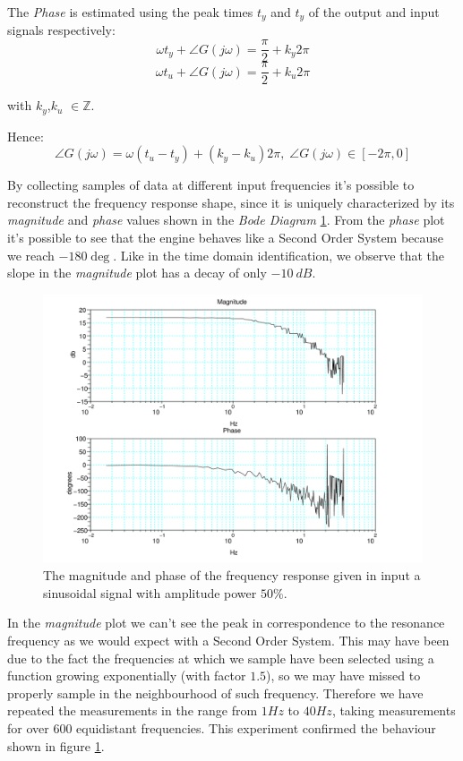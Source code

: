 The \emph{Phase} is estimated using the peak times $t_y$ and $t_y$ of the output and input signals respectively:
\[
\omega{}t_y + \angle{G(j\omega{})}=\frac{\pi{}}{2} + k_y2\pi{}
\]
\[
\omega{}t_u + \angle{G(j\omega{})}=\frac{\pi{}}{2} + k_u2\pi{}
\]

with $k_y$,$k_u$ 
$\in{} \mathbb{Z}$.

Hence:
\[
\angle{G(j\omega{})}=\omega{}(t_u-t_y) + (k_y-k_u)2\pi{},\; \angle{G(j\omega{})} \in{[-2\pi{},0]}
\]

By collecting samples of data at different input frequencies it's possible to reconstruct the frequency response shape, since it is uniquely characterized by its \textit{magnitude} and \textit{phase} values shown in the \emph{Bode Diagram} \ref{fig:bode_plot}. From the \textit{phase} plot it's possible to see that the \LEGOMOTOR{} engine behaves like a Second Order System because we reach $-180\deg$. Like in the time domain identification, we observe that the slope in the \textit{magnitude} plot has a decay of only $-10\:dB$.

\begin{figure}[htbp]
\center
  \includegraphics[scale=0.16]{FIGURES_1/bode_plot_sin.png}
  \caption[Bode Plot]{The magnitude and phase of the frequency response given in input a sinusoidal signal with amplitude power $50\%$.}
  \label{fig:bode_plot}
\end{figure}

In the \textit{magnitude} plot we can't see the peak in correspondence to the resonance frequency as we would expect with a Second Order System. This may have been due to the fact the frequencies at which we sample have been selected using a function growing exponentially (with factor $1.5$), so we may have missed to properly sample in the neighbourhood of such frequency. Therefore we have repeated the measurements in the range from $1 Hz$ to $40 Hz$, taking measurements for over $600$ equidistant frequencies. This experiment confirmed the behaviour shown in figure \ref{fig:bode_plot}.